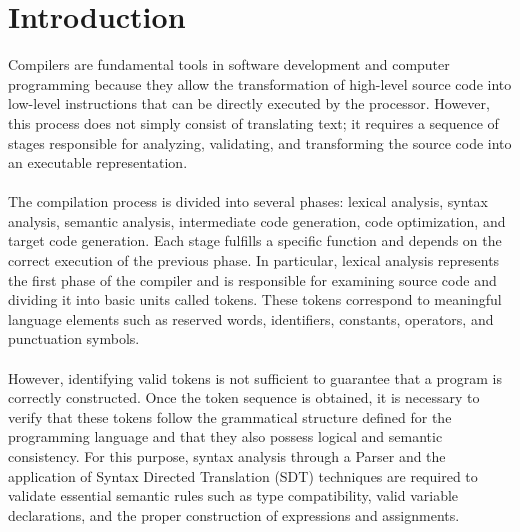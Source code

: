 \documentclass[letterpaper,12pt,oneside]{article}
\begin{document}
\section{Introduction} %

    Compilers are fundamental tools in software development and computer programming because they allow the transformation of high-level source code into low-level instructions that can be directly executed by the processor. However, this process does not simply consist of translating text; it requires a sequence of stages responsible for analyzing, validating, and transforming the source code into an executable representation.
    \\ \\ 
    The compilation process is divided into several phases: lexical analysis, syntax analysis, semantic analysis, intermediate code generation, code optimization, and target code generation. Each stage fulfills a specific function and depends on the correct execution of the previous phase. In particular, lexical analysis represents the first phase of the compiler and is responsible for examining source code and dividing it into basic units called tokens. These tokens correspond to meaningful language elements such as reserved words, identifiers, constants, operators, and punctuation symbols.
    \\ \\
    However, identifying valid tokens is not sufficient to guarantee that a program is correctly constructed. Once the token sequence is obtained, it is necessary to verify that these tokens follow the grammatical structure defined for the programming language and that they also possess logical and semantic consistency. For this purpose, syntax analysis through a Parser and the application of Syntax Directed Translation (SDT) techniques are required to validate essential semantic rules such as type compatibility, valid variable declarations, and the proper construction of expressions and assignments.
\end{document}

